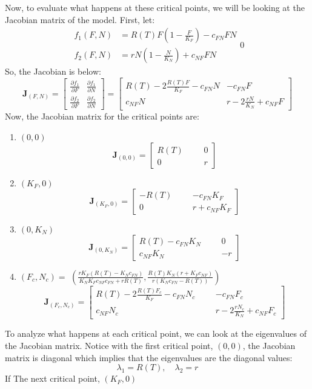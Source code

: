 Now, to evaluate what happens at these critical points, we will be looking at the Jacobian matrix of the model.
First, let:
\[
\begin{aligned}
    f_1(F,N) &= R(T)F\left(1-\frac{F}{K_F}\right) - c_{FN}FN\\[.4cm]
    f_2(F,N) &= rN\left(1-\frac{N}{K_N}\right) + c_{NF}FN
\end{aligned}0
\]
So, the Jacobian is below:
\[
\mathbf{J}_{(F,N)} =
\begin{bmatrix}
  \frac{\partial f_1}{\partial F} & 
    \frac{\partial f_1 }{\partial N}\\
  \frac{\partial f_2}{\partial F} & 
    \frac{\partial f_2}{\partial N}
\end{bmatrix}
=
\begin{bmatrix}
  R(T)-2\frac{R(T)F}{K_F}-c_{FN}N & 
    -c_{FN}F\\
  c_{NF}N & 
    r-2\frac{rN}{K_N}+c_{NF}F
\end{bmatrix}
\]
Now, the Jacobian matrix for the critical points are:
\begin{enumerate}
    \item $(0,0)$
    \[
    \mathbf{J}_{(0,0)} =
    \begin{bmatrix}
  R(T) & & &
    0\\
  0 & & & r
    \end{bmatrix}
    \]
    \item $(K_F,0)$
    \[
    \mathbf{J}_{(K_F,0)} =
    \begin{bmatrix}
  -R(T) & & & -c_{FN}K_F\\
  0 & & & r+c_{NF}K_F
    \end{bmatrix}
    \]
    \item $(0,K_N)$
    \[
    \mathbf{J}_{(0,K_N)} =
    \begin{bmatrix}
  R(T)-c_{FN}K_N & & & 0\\
  c_{NF}K_N & & & -r
    \end{bmatrix}
    \]
    \item $(F_c, N_c)=$ $\left(\frac{rK_F(R(T)-K_Nc_{FN})}{K_NK_Fc_{NF}c_{FN}+rR(T)}, \frac{R(T)K_N(r+K_Fc_{NF})}{r(K_Nc_{FN}-R(T))}\right)$
    \[
    \mathbf{J}_{(F_c,N_c)} =
    \begin{bmatrix}
  R(T)-2\frac{R(T)F_c}{K_F}-c_{FN}N_c & & & 
    -c_{FN}F_c\\
  c_{NF}N_c & & &
    r-2\frac{rN_c}{K_N}+c_{NF}F_c
    \end{bmatrix}
    \]
\end{enumerate}

To analyze what happens at each critical point, we can look at the eigenvalues of the Jacobian matrix. Notice with the first critical point, $(0,0)$, the Jacobian matrix is diagonal which implies that the eigenvalues are the diagonal values:
\[
\lambda_1=R(T),\quad \lambda_2=r
\]
If 
The next critical point, $(K_F,0)$
